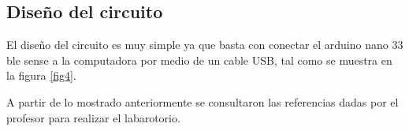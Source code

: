 \subsection*{Diseño del circuito}
El diseño del circuito es muy simple ya que basta con conectar el arduino nano 33 ble sense a la computadora por medio de un cable USB, tal como se muestra en la figura \ref{fig4}.

A partir de lo mostrado anteriormente se consultaron las referencias dadas por el profesor para realizar el labarotorio.
\newpage
